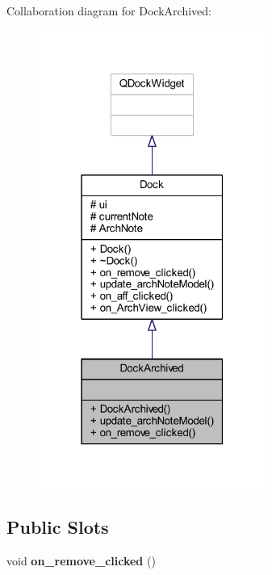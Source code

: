 Collaboration diagram for Dock\+Archived\+:\nopagebreak
\begin{figure}[H]
\begin{center}
\leavevmode
\includegraphics[width=211pt]{class_dock_archived__coll__graph}
\end{center}
\end{figure}
\subsection*{Public Slots}
\begin{DoxyCompactItemize}
\item 
\mbox{\label{class_dock_archived_ab2ec83022057fff8169784cf02876a8a}} 
void {\bfseries on\+\_\+remove\+\_\+clicked} ()
\end{DoxyCompactItemize}
